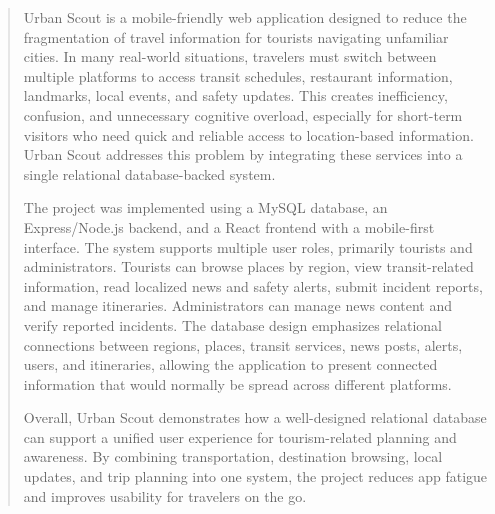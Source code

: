 \begin{abstract}
\large
Urban Scout is a mobile-friendly web application designed to reduce the fragmentation of travel information for tourists navigating unfamiliar cities. In many real-world situations, travelers must switch between multiple platforms to access transit schedules, restaurant information, landmarks, local events, and safety updates. This creates inefficiency, confusion, and unnecessary cognitive overload, especially for short-term visitors who need quick and reliable access to location-based information. Urban Scout addresses this problem by integrating these services into a single relational database-backed system.

\vspace{1em}
The project was implemented using a MySQL database, an Express/Node.js backend, and a React frontend with a mobile-first interface. The system supports multiple user roles, primarily tourists and administrators. Tourists can browse places by region, view transit-related information, read localized news and safety alerts, submit incident reports, and manage itineraries. Administrators can manage news content and verify reported incidents. The database design emphasizes relational connections between regions, places, transit services, news posts, alerts, users, and itineraries, allowing the application to present connected information that would normally be spread across different platforms.

\vspace{1em}
Overall, Urban Scout demonstrates how a well-designed relational database can support a unified user experience for tourism-related planning and awareness. By combining transportation, destination browsing, local updates, and trip planning into one system, the project reduces app fatigue and improves usability for travelers on the go.
\end{abstract}
